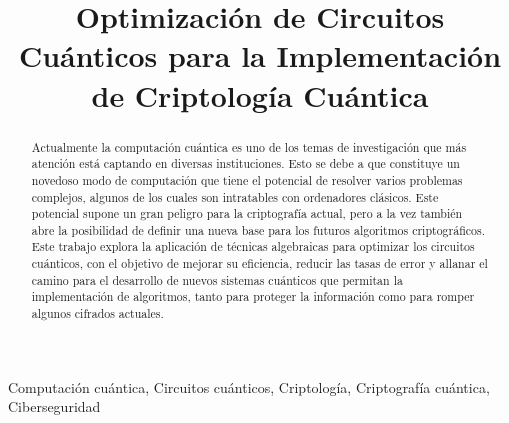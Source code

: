 \documentclass[10pt,conference,a4paper]{IEEEtran}
\begin{document}
    \title{Optimización de Circuitos Cuánticos para la Implementación de Criptología Cuántica}

    \author{
    \and
    \and
    \and
    }


    \maketitle


    \begin{abstract}
        Actualmente la computación cuántica es uno de los temas de investigación que más atención está captando en diversas  instituciones. Esto se debe a que constituye un novedoso modo de computación que tiene el potencial de resolver varios problemas complejos, algunos de los cuales son intratables con ordenadores clásicos. Este potencial supone un gran peligro para la criptografía actual, pero a la vez también abre la posibilidad de definir una nueva base para los futuros algoritmos criptográficos. Este trabajo explora la aplicación de técnicas algebraicas para optimizar los circuitos cuánticos, con el objetivo de mejorar su eficiencia, reducir las tasas de error y allanar el camino para el desarrollo de nuevos sistemas cuánticos que permitan la implementación de algoritmos, tanto para proteger la información como para romper algunos cifrados actuales.
    \end{abstract}


    \begin{IEEEkeywords}
        Computación cuántica, Circuitos cuánticos, Criptología, Criptografía cuántica, Ciberseguridad
    \end{IEEEkeywords}
\end{document}
